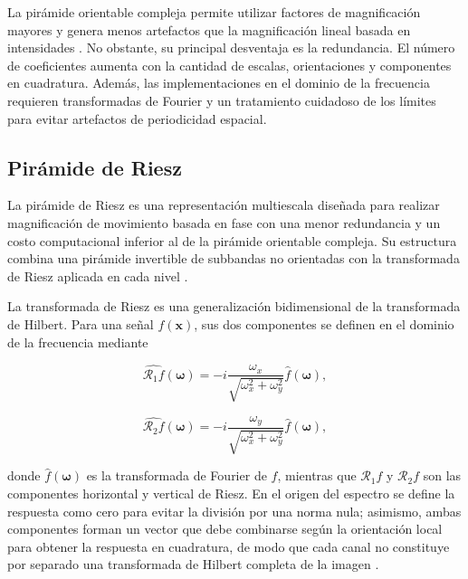 La pirámide orientable compleja permite utilizar factores de magnificación mayores y genera menos artefactos que la magnificación lineal basada en intensidades \cite{wadhwa2013phase}. No obstante, su principal desventaja es la redundancia. El número de coeficientes aumenta con la cantidad de escalas, orientaciones y componentes en cuadratura. Además, las implementaciones en el dominio de la frecuencia requieren transformadas de Fourier y un tratamiento cuidadoso de los límites para evitar artefactos de periodicidad espacial.

	\subsection{Pirámide de Riesz}
	\label{subsubsec:piramide_riesz}

La pirámide de Riesz es una representación multiescala diseñada para realizar magnificación de movimiento basada en fase con una menor redundancia y un costo computacional inferior al de la pirámide orientable compleja. Su estructura combina una pirámide invertible de subbandas no orientadas con la transformada de Riesz aplicada en cada nivel \cite{wadhwa2014riesz}.

La transformada de Riesz es una generalización bidimensional de la transformada de Hilbert. Para una señal $f(\mathbf{x})$, sus dos componentes se definen en el dominio de la frecuencia mediante

\begin{equation}
    \widehat{\mathcal{R}_1f}
    (\boldsymbol{\omega})
    =
    -i
    \frac{\omega_x}
    {\sqrt{\omega_x^2+\omega_y^2}}
    \widehat{f}(\boldsymbol{\omega}),
    \label{eq:riesz_componente_1}
\end{equation}

\begin{equation}
    \widehat{\mathcal{R}_2f}
    (\boldsymbol{\omega})
    =
    -i
    \frac{\omega_y}
    {\sqrt{\omega_x^2+\omega_y^2}}
    \widehat{f}(\boldsymbol{\omega}),
    \label{eq:riesz_componente_2}
\end{equation}

donde $\widehat{f}(\boldsymbol{\omega})$ es la transformada de Fourier de $f$, mientras que $\mathcal{R}_1f$ y $\mathcal{R}_2f$ son las componentes horizontal y vertical de Riesz. En el origen del espectro se define la respuesta como cero para evitar la división por una norma nula; asimismo, ambas componentes forman un vector que debe combinarse según la orientación local para obtener la respuesta en cuadratura, de modo que cada canal no constituye por separado una transformada de Hilbert completa de la imagen \cite{unser2009monogenic}.

